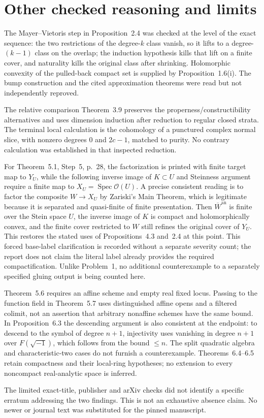 \documentclass[10pt]{article}
\begin{document}
\section*{Other checked reasoning and limits}
The Mayer–Vietoris step in Proposition 2.4 was checked at the level of the exact sequence: the two restrictions of the degree-\(k\) class vanish, so it lifts to a degree-\((k-1)\) class on the overlap; the induction hypothesis kills that lift on a finite cover, and naturality kills the original class after shrinking. Holomorphic convexity of the pulled-back compact set is supplied by Proposition 1.6(i). The bump construction and the cited approximation theorems were read but not independently reproved.\par
The relative comparison Theorem 3.9 preserves the properness/constructibility alternatives and uses dimension induction after reduction to regular closed strata. The terminal local calculation is the cohomology of a punctured complex normal slice, with nonzero degrees \(0\) and \(2c-1\), matched to purity. No contrary calculation was established in that inspected reduction.\par
For Theorem 5.1, Step 5, p. 28, the factorization is printed with finite target map to \(Y_U\), while the following inverse image of \(K\subset U\) and Steinness argument require a finite map to \(X_U=\operatorname{Spec}\mathcal O(U)\). A precise consistent reading is to factor the composite \(W\to X_U\) by Zariski’s Main Theorem, which is legitimate because it is separated and quasi-finite of finite presentation. Then \(\overline W^{\mathrm{an}}\) is finite over the Stein space \(U\), the inverse image of \(K\) is compact and holomorphically convex, and the finite cover restricted to \(W\) still refines the original cover of \(Y_U\). This restores the stated uses of Propositions 4.3 and 2.4 at this point. This forced base-label clarification is recorded without a separate severity count; the report does not claim the literal label already provides the required compactification. Unlike Problem 1, no additional counterexample to a separately specified gluing output is being counted here.\par
Theorem 5.6 requires an affine scheme and empty real fixed locus. Passing to the function field in Theorem 5.7 uses distinguished affine opens and a filtered colimit, not an assertion that arbitrary nonaffine schemes have the same bound. In Proposition 6.3 the descending argument is also consistent at the endpoint: to descend to the symbol of degree \(n+1\), injectivity uses vanishing in degree \(n+1\) over \(F(\sqrt{-1})\), which follows from the bound \(\le n\). The split quadratic algebra and characteristic-two cases do not furnish a counterexample. Theorems 6.4–6.5 retain compactness and their local-ring hypotheses; no extension to every noncompact real-analytic space is inferred.\par
The limited exact-title, publisher and arXiv checks did not identify a specific erratum addressing the two findings. This is not an exhaustive absence claim. No newer or journal text was substituted for the pinned manuscript.\par
\end{document}
